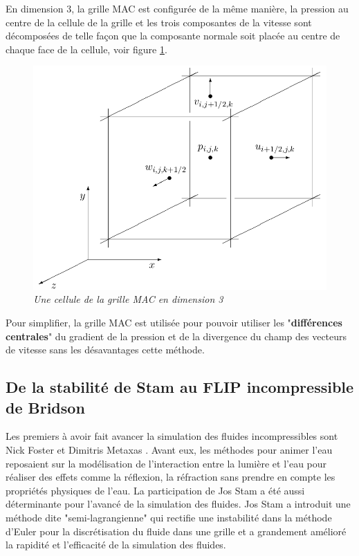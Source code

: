 \documentclass[11pt]{article}
\begin{document}
En dimension 3, la grille MAC est configurée de la même manière, la pression au centre de la cellule de la grille et les trois composantes de la vitesse sont décomposées de telle façon que la composante normale soit placée au centre de chaque face de la cellule, voir figure \ref{figure/3d-mac-grid}.\newline 
\begin{figure}[!htbp]
\centering
\includegraphics[scale=0.5]{3d-mac-grid.png}
\caption{\textit{Une cellule de la grille MAC en dimension 3}}
\label{figure/3d-mac-grid}
\end{figure}
Pour simplifier, la grille MAC est utilisée pour pouvoir utiliser les "\textbf{différences centrales}" du gradient de la pression et de la divergence du champ des vecteurs de vitesse sans les désavantages cette méthode.
\newpage
\subsection{De la stabilité de Stam au FLIP incompressible de Bridson}

Les premiers à avoir fait avancer la simulation des fluides incompressibles sont Nick Foster et Dimitris Metaxas \cite{Foster-96}. Avant eux, les méthodes pour animer l'eau reposaient sur la modélisation de l'interaction entre la lumière et l'eau pour réaliser des effets comme la réflexion, la réfraction sans prendre en compte les propriétés physiques de l'eau. \newline
La participation de Jos Stam \cite{stam-99} a été aussi déterminante pour l'avancé de la simulation des fluides. Jos Stam a introduit une méthode dite "semi-lagrangienne" qui rectifie une instabilité dans la méthode d'Euler pour la discrétisation du fluide dans une grille et a grandement amélioré la rapidité et l'efficacité de la simulation des fluides.
\end{document}

